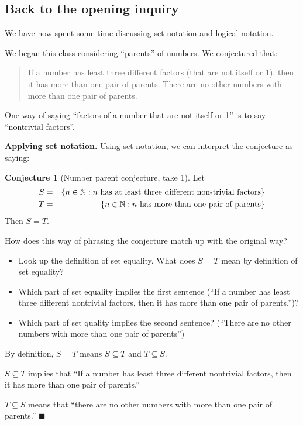 \documentclass[11pt]{article}
\newenvironment{task}
	{\begin{mdframed}[linecolor=lightgray, linewidth=3pt]\raggedright}
	{\end{mdframed}}
\newcommand\tn{\textnormal}
\newcommand{\N}{\mathbb{N}}
\renewcommand\subset\subseteq
\newcommand\st{:}
\theoremstyle{definition}
\newtheorem{conjecture}[theorem]{Conjecture}
\newenvironment{solution}{{\it Solution.} }{\hfill {\color{lightgray}$\blacksquare$}}
\begin{document}
\subsection{Back to the opening inquiry}

We have now spent some time discussing set notation and logical notation.

We began this class considering ``parents'' of numbers. We conjectured that:

\begin{quote}
If a number has least three different factors (that are not itself or 1), then it has more than one pair of parents. There are no other numbers with more than one pair of parents.
\end{quote}

One way of saying ``factors of a number that are not itself or 1'' is to say ``nontrivial factors''.

{\bf Applying set notation.} Using set notation, we can interpret the conjecture as saying:

\begin{conjecture}[Number parent conjecture, take 1]
Let \begin{eqnarray*}
	S&=&\{ n\in \N\st n\tn{ has at least three different non-trivial factors}\} \\ 
	T&=&\{ n\in \N \st n \tn{ has more than one pair of parents}\} 
	\end{eqnarray*}
Then $S=T$.	
\end{conjecture}

\begin{task}
How does this way of phrasing the conjecture match up with the original way? 
	\begin{itemize}
	\item Look up the definition of set equality. What does $S=T$ mean by definition of set equality?
	\item Which part of set equality implies the first sentence (``If a number has least three different nontrivial factors, then it has more than one pair of parents.'')? 
	\item Which part of set quality implies the second sentence? (``There are no other numbers with more than one pair of parents'') 
	\end{itemize}
\end{task}

\begin{solution}
By definition, $S=T$ means $S\subset T$ and $T\subset S$.

$S\subset T$ implies that ``If a number has least three different nontrivial factors, then it has more than one pair of parents.''

$T\subset S$ means that ``there are no other numbers with more than one pair of parents.'' 
\end{solution}
\end{document}
